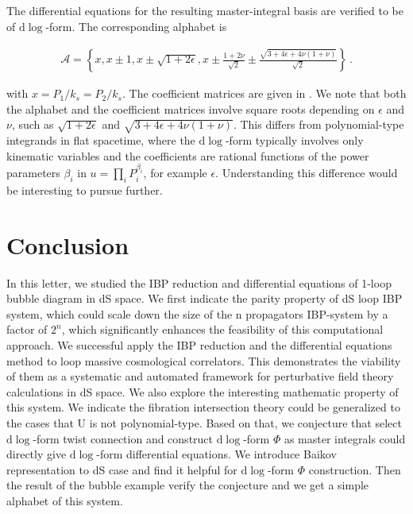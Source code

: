\documentclass[%
 reprint,
 amsmath,amssymb,
 aps,
prd,
]{revtex4-2}
\renewcommand{\rm}{\mathrm}
\def\di{{\mathrm{d}}}
\def\ep{\epsilon}
\newcommand{\cjq}[1]{{\color[rgb]{.1,.6,.3}{[{CJQ:} #1]}}}
\begin{document}
The differential equations for the resulting master-integral basis are verified to be of \(\di\log\)-form. The corresponding alphabet is
\begin{widetext}
\begin{align}
	\mathcal{A} = \left\{ x, x\pm 1, x\pm \sqrt{1+2\epsilon}, x \pm \frac{1+2\nu}{\sqrt{2}} \pm \frac{ \sqrt{3+4\epsilon+4\nu(1+\nu)}}{\sqrt{2}} \right\}\,.
\end{align}
\end{widetext}
with \(x=P_1/k_s=P_2/k_s\).
The coefficient matrices are given in \cjq{attachment or github link?}. We note that both the alphabet and the coefficient matrices involve square roots depending on \(\epsilon\) and \(\nu\), such as \(\sqrt{1+2\epsilon}\) and \(\sqrt{3+4\epsilon+4\nu(1+\nu)}\). This differs from polynomial-type integrands in flat spacetime, where the \(\di\log\)-form typically involves only kinematic variables and the coefficients are rational functions of the power parameters \(\beta_i\) in \(u=\prod_i P_i^{\beta_i}\), for example \(\ep\). Understanding this difference would be interesting to pursue further.






\section{Conclusion}
In this letter, we studied the IBP reduction and differential equations of 1-loop bubble diagram in dS space. We first indicate the parity property of dS loop IBP system, which could scale down the size of the n propagators IBP-system by a factor of $2^n$, which significantly enhances the feasibility of this computational approach. We successful apply the IBP reduction and the differential equations method to loop massive cosmological correlators. This demonstrates the viability of them as a systematic and automated framework for perturbative field theory calculations in dS space.
 We also explore the interesting mathematic property of this system. We indicate the fibration intersection theory could be generalized to the cases that $\bm{\rm U}$ is not polynomial-type. Based on that, we conjecture that select $\di\log$-form twist connection and construct $\di\log$-form $\Phi$ as master integrals could directly give $\di\log$-form differential equations. We introduce Baikov representation to dS case and find it helpful for $\di\log$-form $\Phi$ construction. Then the result of the bubble example verify the conjecture and we get a simple alphabet of this system.
\end{document}
